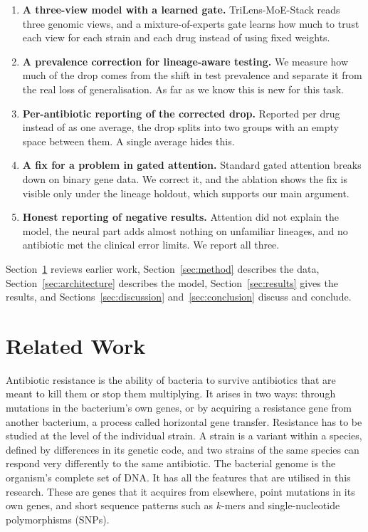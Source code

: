 \documentclass[journal]{IEEEtran}
\begin{document}
\begin{enumerate}
\item \textbf{A three-view model with a learned gate.} TriLens-MoE-Stack reads
three genomic views, and a mixture-of-experts gate learns how much to trust each
view for each strain and each drug instead of using fixed weights.

\item \textbf{A prevalence correction for lineage-aware testing.} We measure how
much of the drop comes from the shift in test prevalence and separate it from the
real loss of generalisation. As far as we know this is new for this task.

\item \textbf{Per-antibiotic reporting of the corrected drop.} Reported per drug
instead of as one average, the drop splits into two groups with an empty space
between them. A single average hides this.

\item \textbf{A fix for a problem in gated attention.} Standard gated attention
breaks down on binary gene data. We correct it, and the ablation shows the fix is
visible only under the lineage holdout, which supports our main argument.

\item \textbf{Honest reporting of negative results.} Attention did not explain the
model, the neural part adds almost nothing on unfamiliar lineages, and no
antibiotic met the clinical error limits. We report all three.
\end{enumerate}

Section~\ref{sec:lit} reviews earlier work, Section~\ref{sec:method} describes the
data, Section~\ref{sec:architecture} describes the model,
Section~\ref{sec:results} gives the results, and Sections~\ref{sec:discussion}
and~\ref{sec:conclusion} discuss and conclude.

\section{Related Work}
\label{sec:lit}

Antibiotic resistance is the ability of bacteria to survive antibiotics that are
meant to kill them or stop them multiplying. It arises in two ways: through
mutations in the bacterium's own genes, or by acquiring a resistance gene from
another bacterium, a process called horizontal gene transfer. Resistance has to be
studied at the level of the individual strain. A strain is a variant within a
species, defined by differences in its genetic code, and two strains of the same
species can respond very differently to the same antibiotic. The bacterial genome
is the organism's complete set of DNA. It has all the features that are utilised in
this research. These are genes that it acquires from elsewhere, point mutations in
its own genes, and short sequence patterns such as $k$-mers and single-nucleotide
polymorphisms (SNPs).
\end{document}
